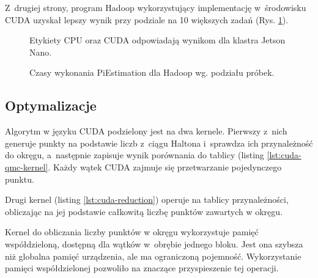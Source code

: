 Z~drugiej strony, program Hadoop wykorzystujący implementację
w~środowisku CUDA uzyskał lepszy wynik przy podziale na 10 większych zadań (Rys. \ref{fig:pisplit:hadoop:1B}).

\begin{figure}[h]
    \centering
    \caption{Czasy wykonania PiEstimation dla Hadoop wg. podziału próbek.}
    \medskip \small
    Etykiety CPU oraz CUDA odpowiadają wynikom dla klastra Jetson Nano.
    \label{fig:pisplit:hadoop:1B}
\end{figure}

\subsection*{Optymalizacje}

Algorytm w języku CUDA podzielony jest na dwa kernele. Pierwszy z~nich generuje punkty na podstawie liczb
z~ciągu Haltona i~sprawdza ich przynależność do okręgu, a~następnie zapisuje wynik porównania do tablicy (listing \ref{lst:cuda-qmc-kernel}. Każdy wątek CUDA zajmuje się przetwarzanie pojedynczego punktu.

Drugi kernel (listing \ref{lst:cuda-reduction}) operuje na tablicy przynależności, obliczając na jej podstawie całkowitą liczbę punktów
zawartych w okręgu.

Kernel do obliczania liczby punktów w okręgu wykorzystuje pamięć współdzieloną, dostępną dla wątków
w~obrębie jednego bloku. Jest ona szybsza niż globalna pamięć urządzenia, ale ma ograniczoną pojemność.
Wykorzystanie pamięci współdzielonej pozwoliło na znaczące przyspieszenie tej operacji.
\newpage

